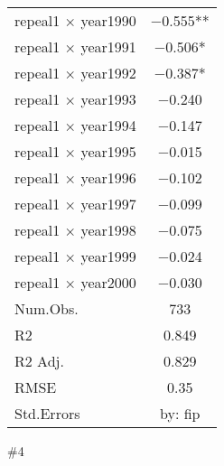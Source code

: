 \documentclass[
]{article}
\begin{document}
\begin{table}
\begin{tabular}[t]{lc}
repeal1 × year1990 & \num{-0.555}**\\
repeal1 × year1991 & \num{-0.506}*\\
repeal1 × year1992 & \num{-0.387}*\\
repeal1 × year1993 & \num{-0.240}\\
repeal1 × year1994 & \num{-0.147}\\
repeal1 × year1995 & \num{-0.015}\\
repeal1 × year1996 & \num{-0.102}\\
repeal1 × year1997 & \num{-0.099}\\
repeal1 × year1998 & \num{-0.075}\\
repeal1 × year1999 & \num{-0.024}\\
repeal1 × year2000 & \num{-0.030}\\
\midrule
Num.Obs. & \num{733}\\
R2 & \num{0.849}\\
R2 Adj. & \num{0.829}\\
RMSE & \num{0.35}\\
Std.Errors & by: fip\\
\bottomrule
\end{tabular}
\end{table}

\#4
\end{document}
